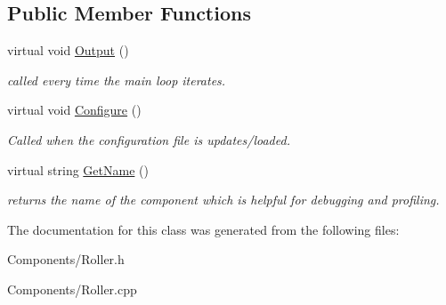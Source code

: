 \subsection*{\-Public \-Member \-Functions}
\begin{DoxyCompactItemize}
\item 
\hypertarget{class_roller_abb59da9d3fbd39e2c1c9fd3afe72ede5}{
virtual void \hyperlink{class_roller_abb59da9d3fbd39e2c1c9fd3afe72ede5}{\-Output} ()}
\label{class_roller_abb59da9d3fbd39e2c1c9fd3afe72ede5}

\begin{DoxyCompactList}\small\item\em called every time the main loop iterates. \end{DoxyCompactList}\item 
\hypertarget{class_roller_acb20e60d81cacd2d4f5caf2c5ad228da}{
virtual void \hyperlink{class_roller_acb20e60d81cacd2d4f5caf2c5ad228da}{\-Configure} ()}
\label{class_roller_acb20e60d81cacd2d4f5caf2c5ad228da}

\begin{DoxyCompactList}\small\item\em \-Called when the configuration file is updates/loaded. \end{DoxyCompactList}\item 
\hypertarget{class_roller_a79e4c46cf088983548f3e7455dd021d5}{
virtual string \hyperlink{class_roller_a79e4c46cf088983548f3e7455dd021d5}{\-Get\-Name} ()}
\label{class_roller_a79e4c46cf088983548f3e7455dd021d5}

\begin{DoxyCompactList}\small\item\em returns the name of the component which is helpful for debugging and profiling. \end{DoxyCompactList}\end{DoxyCompactItemize}


\-The documentation for this class was generated from the following files\-:\begin{DoxyCompactItemize}
\item 
\-Components/\-Roller.\-h\item 
\-Components/\-Roller.\-cpp\end{DoxyCompactItemize}
